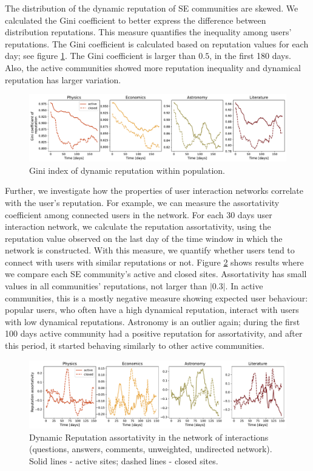 The distribution of the dynamic reputation of SE communities are skewed. We calculated the Gini coefficient to better express the difference between distribution reputations. This measure quantifies the inequality among users' reputations. The Gini coefficient is calculated based on reputation values for each day; see figure \ref{fig:dynrep-gini}. The Gini coefficient is larger than $0.5$, in the first 180 days. Also, the active communities showed more reputation inequality and dynamical reputation has larger variation. 

\begin{figure}[h]
	\centering
	\includegraphics[width=1\linewidth]{figures/stackexchange/gini.pdf}
	\caption[Gini index of dynamic reputation]{Gini index of dynamic reputation within population.}
	\label{fig:dynrep-gini}
\end{figure} 

Further, we investigate how the properties of user interaction networks correlate with the user's reputation. For example, we can measure the assortativity coefficient among connected users in the network. For each 30 days user interaction network, we calculate the reputation assortativity, using the reputation value observed on the last day of the time window in which the network is constructed. With this measure, we quantify whether users tend to connect with users with similar reputations or not. Figure \ref{fig:dyn_rep_assort} shows results where we compare each SE community's active and closed sites. Assortativity has small values in all communities' reputations, not larger than $|0.3|$. In active communities, this is a mostly negative measure showing expected user behaviour: popular users, who often have a high dynamical reputation, interact with users with low dynamical reputations. Astronomy is an outlier again; during the first 100 days active community had a positive reputation for assortativity, and after this period, it started behaving similarly to other active communities. 

\begin{figure}[h]
	\centering
	\includegraphics[width=1\linewidth]{figures/stackexchange/reputation_assortativity.pdf}
	\caption[Dynamic Reputation assortativity]{Dynamic Reputation assortativity in the network of interactions (questions, answers, comments, unweighted, undirected network). Solid lines - active sites; dashed lines - closed sites.}
	\label{fig:dyn_rep_assort}
\end{figure}

